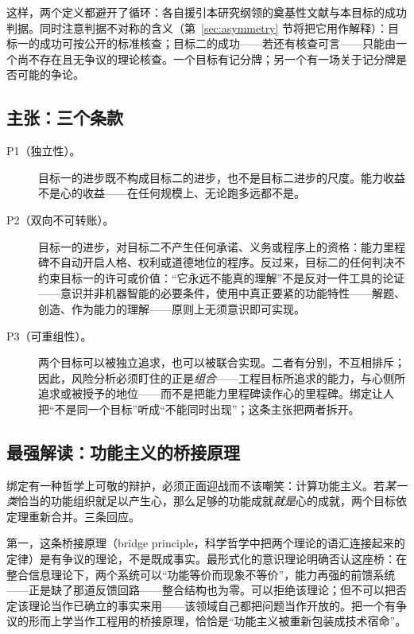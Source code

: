 \documentclass[10pt,fontset=fandol]{ctexart}
\begin{document}
这样，两个定义都避开了循环：各自援引本研究纲领的奠基性文献与本目标的成功判据。同时注意判据不对称的含义（第~\ref{sec:asymmetry} 节将把它用作解释）：目标一的成功可按公开的标准核查；目标二的成功——若还有核查可言——只能由一个尚不存在且无争议的理论核查。一个目标有记分牌；另一个有一场关于记分牌是否可能的争论。

\subsection{主张：三个条款}\label{sec:clauses}

\begin{description}
\item[P1（独立性）。]目标一的进步既不构成目标二的进步，也不是目标二进步的尺度。能力收益不是心的收益——在任何规模上、无论跑多远都不是。
\item[P2（双向不可转账）。]目标一的进步，对目标二不产生任何承诺、义务或程序上的资格：能力里程碑不自动开启人格、权利或道德地位的程序。反过来，目标二的任何判决不约束目标一的许可或价值：“它永远不能真的理解”不是反对一件工具的论证——意识并非机器智能的必要条件，使用中真正要紧的功能特性——解题、创造、作为能力的理解——原则上无须意识即可实现\cite{pesonen2026notobstacles}。
\item[P3（可重组性）。]两个目标可以被独立追求，也可以被联合实现。二者有分别，不互相排斥；因此，风险分析必须盯住的正是\emph{组合}——工程目标所追求的能力，与心侧所追求或被授予的地位——而不是把能力里程碑读作心的里程碑。绑定让人把“不是同一个目标”听成“不能同时出现”；这条主张把两者拆开。
\end{description}

\subsection{最强解读：功能主义的桥接原理}\label{sec:charitable}

绑定有一种哲学上可敬的辩护，必须正面迎战而不该嘲笑：计算功能主义。若\emph{某一类}恰当的功能组织就足以产生心，那么足够的功能成就\emph{就是}心的成就，两个目标依定理重新合并。三条回应。

第一，这条桥接原理（bridge principle，科学哲学中把两个理论的语汇连接起来的定律）是有争议的理论，不是既成事实。最形式化的意识理论明确否认这座桥：在整合信息理论下，两个系统可以“功能等价而现象不等价”，能力再强的前馈系统——正是缺了那道反馈回路——整合结构也为零\cite{findlay2024dissociating,albantakis2023iit}。可以拒绝该理论；但不可以把否定该理论当作已确立的事实来用——该领域自己都把问题当作开放的\cite{butlin2023consciousness}。把一个有争议的形而上学当作工程用的桥接原理，恰恰是“功能主义被重新包装成技术宿命”\cite{jorge2026harsh}。
\end{document}
